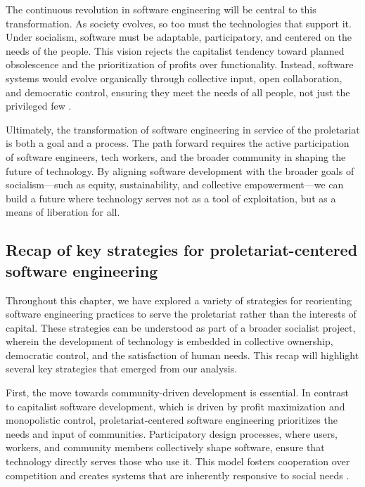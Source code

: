 \begin{refsection}
The continuous revolution in software engineering will be central to this transformation. As society evolves, so too must the technologies that support it. Under socialism, software must be adaptable, participatory, and centered on the needs of the people. This vision rejects the capitalist tendency toward planned obsolescence and the prioritization of profits over functionality. Instead, software systems would evolve organically through collective input, open collaboration, and democratic control, ensuring they meet the needs of all people, not just the privileged few \cite[pp.~56-58]{cockshott1993}.

Ultimately, the transformation of software engineering in service of the proletariat is both a goal and a process. The path forward requires the active participation of software engineers, tech workers, and the broader community in shaping the future of technology. By aligning software development with the broader goals of socialism—such as equity, sustainability, and collective empowerment—we can build a future where technology serves not as a tool of exploitation, but as a means of liberation for all.

\subsection{Recap of key strategies for proletariat-centered software engineering}

Throughout this chapter, we have explored a variety of strategies for reorienting software engineering practices to serve the proletariat rather than the interests of capital. These strategies can be understood as part of a broader socialist project, wherein the development of technology is embedded in collective ownership, democratic control, and the satisfaction of human needs. This recap will highlight several key strategies that emerged from our analysis.

First, the move towards community-driven development is essential. In contrast to capitalist software development, which is driven by profit maximization and monopolistic control, proletariat-centered software engineering prioritizes the needs and input of communities. Participatory design processes, where users, workers, and community members collectively shape software, ensure that technology directly serves those who use it. This model fosters cooperation over competition and creates systems that are inherently responsive to social needs \cite[pp.~53-55]{stallman2010}.


\end{refsection}

